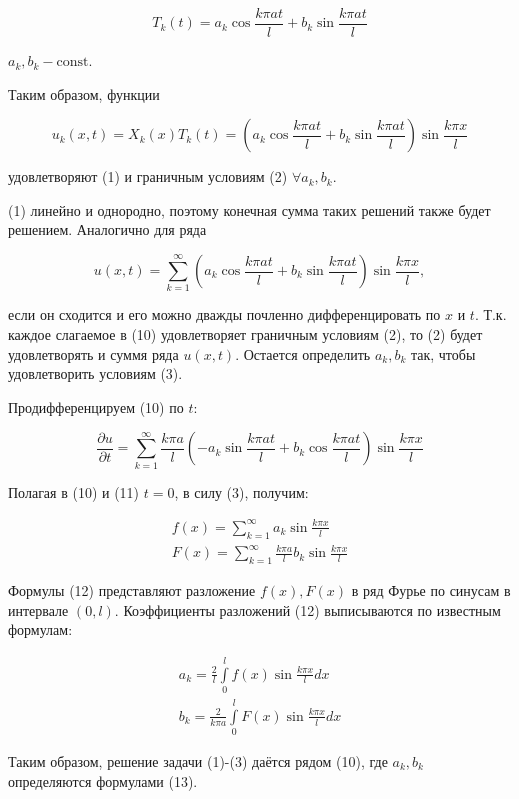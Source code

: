 \begin{enumerate}
{			\[
				T_k (t) = a_k \cos \frac{k \pi at}{l} + b_k \sin \frac{k \pi at}{l}
			\]

			$a_k, b_k - \mathrm{const}$.

			Таким образом, функции

			\[
				u_k (x, t) = X_k (x) T_k (t) = \left( a_k \cos \frac{k \pi at}{l} + b_k \sin \frac{k \pi at}{l} \right) \sin \frac{k \pi x}{l}
			\]

			удовлетворяют (1) и граничным условиям (2) $\forall a_k, b_k$.

			(1) линейно и однородно, поэтому конечная сумма таких решений также будет решением. Аналогично для ряда

			\[
				u(x, t) = \sum_{k=1}^\infty \left( a_k \cos \frac{k \pi at}{l} + b_k \sin \frac{k \pi at}{l} \right) \sin \frac{k \pi x}{l}, \tag{10}
			\]

			если он сходится и его можно дважды почленно дифференцировать по $x$ и $t$. Т.к. каждое слагаемое в (10) удовлетворяет граничным условиям (2), то (2) будет удовлетворять и суммя ряда $u(x, t)$. Остается определить $a_k, b_k$ так, чтобы удовлетворить условиям (3).

			Продифференцируем (10) по $t$:

			\[
				\frac{\partial u}{\partial t} = \sum_{k=1}^\infty \frac{k \pi a}{l} \left( -a_k \sin \frac{k \pi at}{l} + b_k \cos \frac{k \pi at}{l} \right) \sin \frac{k \pi x}{l} \tag{11}
			\]

			Полагая в (10) и (11) $t=0$, в силу (3), получим:

			\[
				\begin{aligned}
					f(x) = \sum_{k=1}^\infty a_k \sin \frac{k \pi x}{l} \\
					F(x) = \sum_{k=1}^\infty \frac{k \pi a}{l} b_k \sin \frac{k \pi x}{l}
				\end{aligned}
				\tag{12}
			\]

			Формулы (12) представляют разложение $f(x), F(x)$ в ряд Фурье по синусам в интервале $(0, l)$. Коэффициенты разложений (12) выписываются по известным формулам:

			\[
				\begin{aligned}
					a_k = \frac{2}{l} \int\limits_0^l f(x) \sin \frac{k \pi x}{l} dx \\
					b_k = \frac{2}{k \pi a} \int\limits_0^l F(x) \sin \frac{k \pi x}{l} dx
				\end{aligned}
				\tag{13}
			\]

			Таким образом, решение задачи (1)-(3) даётся рядом (10), где $a_k, b_k$ определяются формулами (13).
	}
\end{enumerate}

